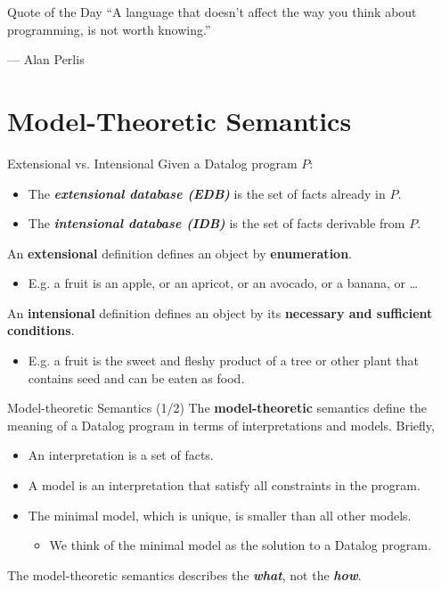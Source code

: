 \begin{frame}{Quote of the Day}
``A language that doesn't affect the way you think about programming, is not
worth knowing.''

\begin{flushright}
--- Alan Perlis
\end{flushright}
\end{frame}



\section{Model-Theoretic Semantics}

\begin{frame}{Extensional vs. Intensional}
Given a Datalog program $P$:
\begin{itemize}
    \item The \textbf{\emph{extensional database (EDB)}} is the set of facts
    already in $P$.
    \item The \textbf{\emph{intensional database (IDB)}} is the set of facts
    derivable from $P$.
\end{itemize}

An \textbf{extensional} definition defines an object by \textbf{enumeration}.
\begin{itemize}
    \item E.g. a fruit is an apple, or an apricot, or an avocado, or a banana, or …
\end{itemize}

An \textbf{intensional} definition defines an object by its \textbf{necessary
and sufficient conditions}.
\begin{itemize}
    \item E.g. a fruit is the sweet and fleshy product of a tree or other plant that contains seed and can be eaten as food.
\end{itemize}    
\end{frame}

\begin{frame}{Model-theoretic Semantics (1/2)}
The \textbf{model-theoretic} semantics define the meaning of a Datalog program
in terms of interpretations and models. Briefly,
\begin{itemize}
    \item An interpretation is a set of facts.
    \item A model is an interpretation that satisfy all constraints in the program.
    \item The minimal model, which is unique, is smaller than all other models.
        \begin{itemize}
            \item We think of the minimal model as the solution to a Datalog program.
        \end{itemize}
\end{itemize}

The model-theoretic semantics describes the \textbf{\emph{what}}, not the
\textbf{\emph{how}}.
\end{frame}


